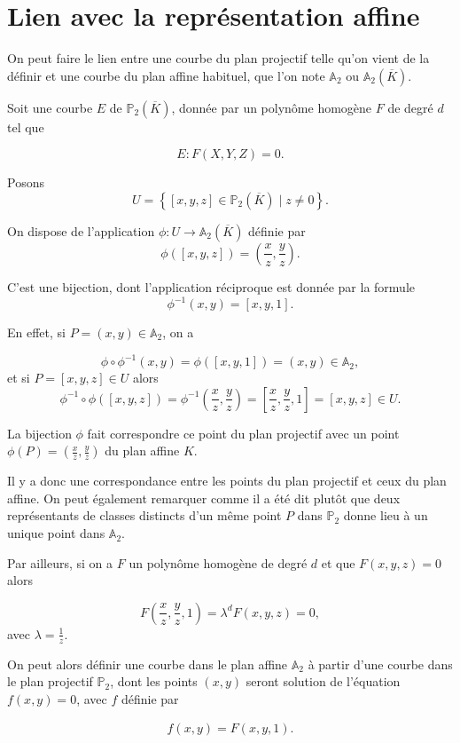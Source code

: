\section{Lien avec la représentation affine}
On peut faire le lien entre une courbe du plan projectif telle qu'on vient de la définir
et une courbe du plan affine habituel, que l'on note $\mathbb{A}_{2}$ ou
$\mathbb{A}_{2}(\overline{K})$. 

Soit une courbe $E$ de $\mathbb{P}_{2}(\overline{K})$, donnée par un
polynôme homogène $F$ de degré $d$ tel que 

\[
E : F(X,Y,Z)=0
.\] 

Posons 
\[
U = \left\{ [x,y,z] \in \mathbb{P}_{2}(\overline{K}) \mid z \neq 0 \right\} 
.\] 

On dispose de l'application $\phi : U \to \mathbb{A}_{2}(\overline{K})$ définie par
\[
\phi([x,y,z])=\left( \frac{x}{z},\frac{y}{z} \right) 
.\] 

C'est une bijection, dont l'application réciproque est donnée par la formule
\[
\phi^{-1}(x,y)=\left[ x,y,1 \right] 
.\] 

En effet, si $P = (x,y) \in \mathbb{A}_{2}$, on a

\[
\phi \circ \phi^{-1} (x,y) = \phi([x,y,1]) = (x,y) \in \mathbb{A}_{2}
,\] 
et si $P = [x,y,z] \in U$ alors
\[
\phi^{-1} \circ \phi ([x,y,z]) = \phi^{-1}(\frac{x}{z},\frac{y}{z}) = [\frac{x}{z},\frac{y}{z},1] =
[x,y,z] \in U
.\] 

La bijection $\phi$ fait correspondre ce point du plan projectif avec un point
$\phi(P) = (\frac{x}{z},\frac{y}{z})$ du plan affine $K$. 

Il y a donc une correspondance entre les points du plan projectif et ceux du plan affine.
On peut également remarquer comme il a été dit plutôt que deux représentants de classes
distincts d'un même point $P$ dans $\mathbb{P}_{2}$ donne lieu à un unique point dans
$\mathbb{A}_{2}$.

Par ailleurs, si on a $F$ un polynôme homogène de degré $d$ et que $F(x,y,z) = 0$ alors 

\[
F(\frac{x}{z},\frac{y}{z},1) = \lambda^{d} F(x,y,z) = 0
,\] 
avec $\lambda = \frac{1}{z}$.

On peut alors définir une courbe dans le plan affine $\mathbb{A}_{2}$ à partir d'une
courbe dans le plan projectif $\mathbb{P}_{2}$, dont les points $(x,y)$ seront solution de
l'équation $f(x,y) = 0$, avec $f$ définie par

\begin{align}
    \label{eq:bijectionP2}
    f(x,y) = F(x,y,1)
.\end{align}


